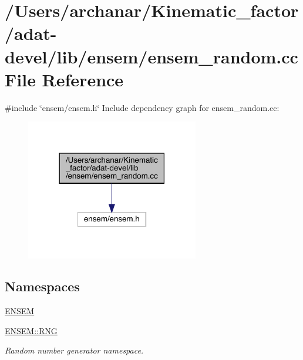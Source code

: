 \hypertarget{adat-devel_2lib_2ensem_2ensem__random_8cc}{}\section{/\+Users/archanar/\+Kinematic\+\_\+factor/adat-\/devel/lib/ensem/ensem\+\_\+random.cc File Reference}
\label{adat-devel_2lib_2ensem_2ensem__random_8cc}
{\ttfamily \#include \char`\"{}ensem/ensem.\+h\char`\"{}}\newline
Include dependency graph for ensem\+\_\+random.\+cc\+:
\nopagebreak
\begin{figure}[H]
\begin{center}
\leavevmode
\includegraphics[width=214pt]{dc/d74/adat-devel_2lib_2ensem_2ensem__random_8cc__incl}
\end{center}
\end{figure}
\subsection*{Namespaces}
\begin{DoxyCompactItemize}
\item 
 \mbox{\hyperlink{namespaceENSEM}{E\+N\+S\+EM}}
\item 
 \mbox{\hyperlink{namespaceENSEM_1_1RNG}{E\+N\+S\+E\+M\+::\+R\+NG}}
\begin{DoxyCompactList}\small\item\em Random number generator namespace. \end{DoxyCompactList}\end{DoxyCompactItemize}
